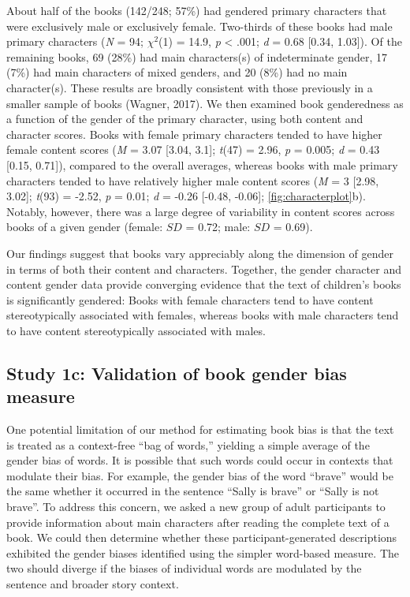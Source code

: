 \documentclass[
  english,
  ,man,floatsintext]{apa6}
\begin{document}
About half of the books (142/248; 57\%) had gendered primary characters that were exclusively male or exclusively female. Two-thirds of these books had male primary characters (\emph{N} = 94; \(\chi^2\)(1) = 14.9, \emph{p} \textless{} .001; \emph{d} = 0.68 {[}0.34, 1.03{]}). Of the remaining books, 69 (28\%) had main characters(s) of indeterminate gender, 17 (7\%) had main characters of mixed genders, and 20 (8\%) had no main character(s). These results are broadly consistent with those previously in a smaller sample of books (Wagner, 2017). We then examined book genderedness as a function of the gender of the primary character, using both content and character scores. Books with female primary characters tended to have higher female content scores (\emph{M} = 3.07 {[}3.04, 3.1{]}; \emph{t}(47) = 2.96, \emph{p} = 0.005; \emph{d} = 0.43 {[}0.15, 0.71{]}), compared to the overall averages, whereas books with male primary characters tended to have relatively higher male content scores (\emph{M} = 3 {[}2.98, 3.02{]}; \emph{t}(93) = -2.52, \emph{p} = 0.01; \emph{d} = -0.26 {[}-0.48, -0.06{]}; \autoref{fig:characterplot}b). Notably, however, there was a large degree of variability in content scores across books of a given gender (female: \(SD\) = 0.72; male: \(SD\) = 0.69).

Our findings suggest that books vary appreciably along the dimension of gender in terms of both their content and characters. Together, the gender character and content gender data provide converging evidence that the text of children's books is significantly gendered: Books with female characters tend to have content stereotypically associated with females, whereas books with male characters tend to have content stereotypically associated with males.

\hypertarget{study-1c-validation-of-book-gender-bias-measure}{%
\subsection{Study 1c: Validation of book gender bias measure}\label{study-1c-validation-of-book-gender-bias-measure}}

One potential limitation of our method for estimating book bias is that the text is treated as a context-free \enquote{bag of words,} yielding a simple average of the gender bias of words. It is possible that such words could occur in contexts that modulate their bias. For example, the gender bias of the word \enquote{brave} would be the same whether it occurred in the sentence \enquote{Sally is brave} or \enquote{Sally is not brave}. To address this concern, we asked a new group of adult participants to provide information about main characters after reading the complete text of a book. We could then determine whether these participant-generated descriptions exhibited the gender biases identified using the simpler word-based measure. The two should diverge if the biases of individual words are modulated by the sentence and broader story context.
\end{document}
